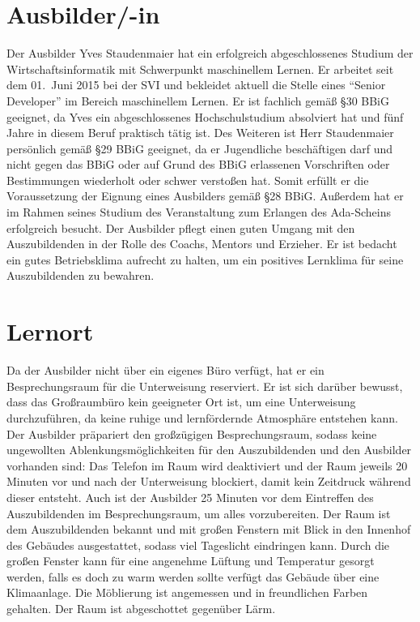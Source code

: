 \section{Ausbilder/-in}
Der Ausbilder Yves Staudenmaier hat ein erfolgreich abgeschlossenes Studium der Wirtschaftsinformatik mit Schwerpunkt maschinellem Lernen. Er arbeitet seit dem 01.~Juni 2015 bei der \ac{SVI} und bekleidet aktuell die Stelle eines \enquote{Senior Developer} im Bereich maschinellem Lernen. Er ist fachlich gemäß §30 BBiG geeignet, da Yves ein abgeschlossenes Hochschulstudium absolviert hat und fünf Jahre in diesem Beruf praktisch tätig ist. Des Weiteren ist Herr Staudenmaier persönlich gemäß §29 BBiG geeignet, da er Jugendliche beschäftigen darf und nicht gegen das \ac{BBiG} oder auf Grund des \ac{BBiG} erlassenen Vorschriften oder Bestimmungen wiederholt oder schwer verstoßen hat. Somit erfüllt er die Voraussetzung der Eignung eines Ausbilders gemäß §28 BBiG. Außerdem hat er im Rahmen seines Studium des Veranstaltung zum Erlangen des Ada-Scheins erfolgreich besucht. Der Ausbilder pflegt einen guten Umgang mit den Auszubildenden in der Rolle des Coachs, Mentors und Erzieher. Er ist bedacht ein gutes Betriebsklima aufrecht zu halten, um ein positives Lernklima für seine Auszubildenden zu bewahren.

\section{Lernort}
Da der Ausbilder nicht über ein eigenes Büro verfügt, hat er ein Besprechungsraum für die Unterweisung reserviert. Er ist sich darüber bewusst, dass das Großraumbüro kein geeigneter Ort ist, um eine Unterweisung durchzuführen, da keine ruhige und lernfördernde Atmosphäre entstehen kann. Der Ausbilder präpariert den großzügigen Besprechungsraum, sodass keine ungewollten Ablenkungsmöglichkeiten für den Auszubildenden und den Ausbilder vorhanden sind: Das Telefon im Raum wird deaktiviert und der Raum jeweils 20 Minuten vor und nach der Unterweisung blockiert, damit kein Zeitdruck während dieser entsteht. Auch ist der Ausbilder 25 Minuten vor dem Eintreffen des Auszubildenden im Besprechungsraum, um alles vorzubereiten. Der Raum ist dem Auszubildenden bekannt und mit großen Fenstern mit Blick in den Innenhof des Gebäudes ausgestattet, sodass viel Tageslicht eindringen kann. Durch die großen Fenster kann für eine angenehme Lüftung und Temperatur gesorgt werden, falls es doch zu warm werden sollte verfügt das Gebäude über eine Klimaanlage. Die Möblierung ist angemessen und in freundlichen Farben gehalten. Der Raum ist abgeschottet gegenüber Lärm. 

